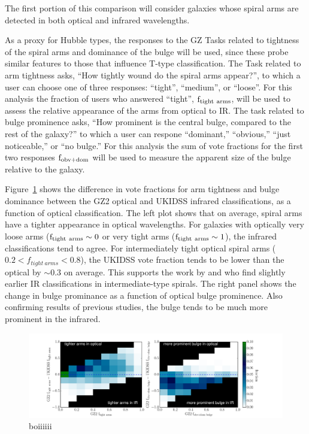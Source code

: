 The first portion of this comparison will consider galaxies whose spiral arms are detected in both optical and infrared wavelengths. 

As a proxy for Hubble types, the responses to the GZ Tasks related to tightness of the spiral arms and dominance of the bulge will be used, since these probe similar features to those that influence T-type classification. The Task related to arm tightness asks, ``How tightly wound do the spiral arms appear?'', to which a user can choose one of three responses: ``tight'', ``medium'', or ``loose''. For this analysis the fraction of users who answered ``tight'', $\rm f_{tight~arms}$, will be used to assess the relative appearance of the arms from optical to IR. The task related to bulge prominence asks, ``How prominent is the central bulge, compared to the rest of the galaxy?'' to which a user can respone ``dominant,'' ``obvious,'' ``just noticeable,'' or ``no bulge.'' For this analysis the sum of vote fractions for the first two responses $\rm f_{obv+dom} $ will be used to measure the apparent size of the bulge relative to the galaxy.   

Figure~\ref{fig:ttype} shows the difference in vote fractions for arm tightness and bulge dominance between the GZ2 optical and UKIDSS infrared classifications, as a function of optical classification. The left plot shows that on average, spiral arms have a tighter appearance in optical wavelengths. For galaxies with optically very loose arms ($\rm f_{tight~arms} \sim 0$ or very tight arms ($\rm f_{tight~arms} \sim 1$), the infrared classifications tend to agree. For intermediately tight optical spiral arms ($0.2 < f_{tight~arms} < 0.8$), the UKIDSS vote fraction tends to be lower than the optical by $\sim 0.3$ on average. This supports the work by \citet{Eskridge2002} and \citet{Buta2010} who find slightly earlier IR classifications in intermediate-type spirals. The right panel shows the change in bulge prominance as a function of optical bulge prominence. Also confirming results of previous studies, the bulge tends to be much more prominent in the infrared. 

\begin{figure}
\centering
\includegraphics[width=1\textwidth]{figures/t_type.pdf}
\caption{boiiiiii}
\label{fig:ttype}
\end{figure}





 
